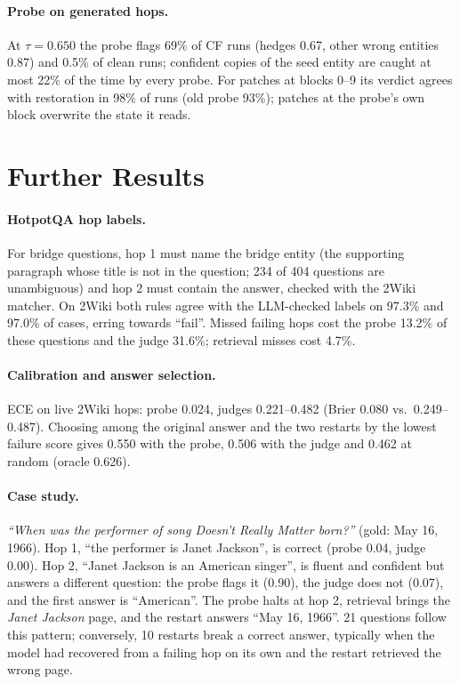 \documentclass[11pt]{article}
\begin{document}
\paragraph{Probe on generated hops.} At $\tau{=}0.650$ the probe flags 69\% of CF runs (hedges 0.67, other wrong entities 0.87) and 0.5\% of clean runs; confident copies of the seed entity are caught at most 22\% of the time by every probe. For patches at blocks 0--9 its verdict agrees with restoration in 98\% of runs (old probe 93\%); patches at the probe's own block overwrite the state it reads.

\section{Further Results}
\label{app:hotpot}

\paragraph{HotpotQA hop labels.} For bridge questions, hop 1 must name the bridge entity (the supporting paragraph whose title is not in the question; 234 of 404 questions are unambiguous) and hop 2 must contain the answer, checked with the 2Wiki matcher. On 2Wiki both rules agree with the LLM-checked labels on 97.3\% and 97.0\% of cases, erring towards ``fail''. Missed failing hops cost the probe 13.2\% of these questions and the judge 31.6\%; retrieval misses cost 4.7\%.

\paragraph{Calibration and answer selection.} ECE on live 2Wiki hops: probe 0.024, judges 0.221--0.482 (Brier 0.080 vs.\ 0.249--0.487). Choosing among the original answer and the two restarts by the lowest failure score gives 0.550 with the probe, 0.506 with the judge and 0.462 at random (oracle 0.626).

\paragraph{Case study.} \emph{``When was the performer of song Doesn't Really Matter born?''} (gold: May 16, 1966). Hop 1, ``the performer is Janet Jackson'', is correct (probe 0.04, judge 0.00). Hop 2, ``Janet Jackson is an American singer'', is fluent and confident but answers a different question: the probe flags it (0.90), the judge does not (0.07), and the first answer is ``American''. The probe halts at hop 2, retrieval brings the \emph{Janet Jackson} page, and the restart answers ``May 16, 1966''. 21 questions follow this pattern; conversely, 10 restarts break a correct answer, typically when the model had recovered from a failing hop on its own and the restart retrieved the wrong page.
\end{document}
